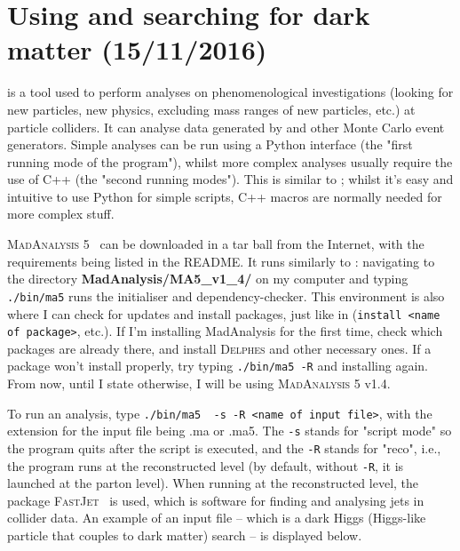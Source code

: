 \newpage
\chapter{Using \madanalysis and searching for dark matter (15/11/2016)}

\madanalysis is a tool used to perform analyses on phenomenological investigations (looking for new particles, new physics, excluding mass ranges of new particles, etc.) at particle colliders. It can analyse data generated by \madgraph and other Monte Carlo event generators. Simple analyses can be run using a Python interface (the "first running mode of the program"), whilst more complex analyses usually require the use of C++ (the "second running modes"). This is similar to \ROOT; whilst it's easy and intuitive to use Python for simple scripts, C++ macros are normally needed for more complex stuff.

\textsc{MadAnalysis 5}~\cite{Conte:2012madanalysis} can be downloaded in a tar ball from the Internet, with the requirements being listed in the README. It runs similarly to \madgraph: navigating to the directory \textbf{MadAnalysis/MA5\_v1\_4/} on my computer and typing \verb!./bin/ma5! runs the initialiser and dependency-checker. This environment is also where I can check for updates and install packages, just like in \madgraph (\verb!install <name of package>!, etc.). If I'm installing MadAnalysis for the first time, check which packages are already there, and install \textsc{Delphes} and other necessary ones. If a package won't install properly, try typing \verb!./bin/ma5 -R! and installing again. From now, until I state otherwise, I will be using \textsc{MadAnalysis 5} v1.4.

To run an analysis, type \verb!./bin/ma5  -s -R <name of input file>!, with the extension for the input file being .ma or .ma5. The \verb!-s! stands for "script mode" so the program quits after the script is executed, and the \verb!-R! stands for "reco", i.e., the program runs at the reconstructed level (by default, without \verb!-R!, it is launched at the parton level). When running at the reconstructed level, the package \textsc{FastJet}~\cite{Cacciari:2011fastjet} is used, which is software for finding and analysing jets in collider data. An example of an input file -- which is a dark Higgs (Higgs-like particle that couples to dark matter) search -- is displayed below.



